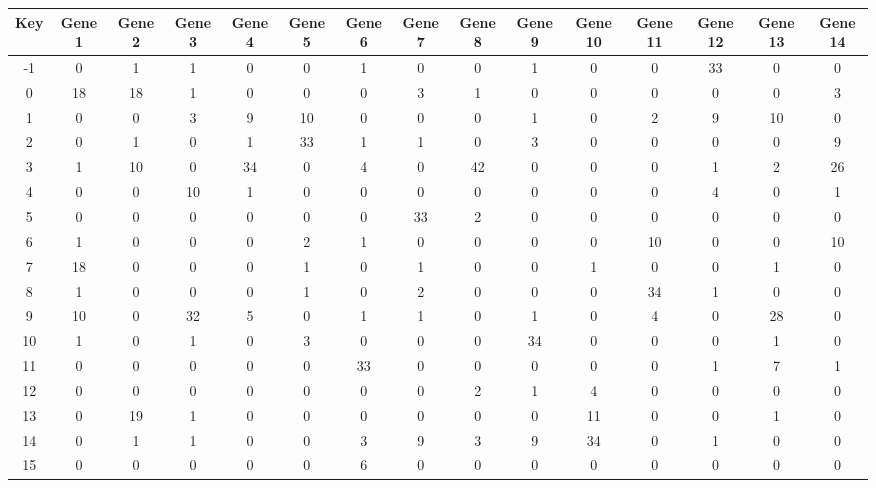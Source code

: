 \begin{tabular}{|c|c|c|c|c|c|c|c|c|c|c|c|c|c|c|}
\hline
Key & Gene 1 & Gene 2 & Gene 3 & Gene 4 & Gene 5 & Gene 6 & Gene 7 & Gene 8 & Gene 9 & Gene 10 & Gene 11 & Gene 12 & Gene 13 & Gene 14 \\
\hline
-1 & 0 & 1 & 1 & 0 & 0 & 1 & 0 & 0 & 1 & 0 & 0 & 33 & 0 & 0 \\
0 & 18 & 18 & 1 & 0 & 0 & 0 & 3 & 1 & 0 & 0 & 0 & 0 & 0 & 3 \\
1 & 0 & 0 & 3 & 9 & 10 & 0 & 0 & 0 & 1 & 0 & 2 & 9 & 10 & 0 \\
2 & 0 & 1 & 0 & 1 & 33 & 1 & 1 & 0 & 3 & 0 & 0 & 0 & 0 & 9 \\
3 & 1 & 10 & 0 & 34 & 0 & 4 & 0 & 42 & 0 & 0 & 0 & 1 & 2 & 26 \\
4 & 0 & 0 & 10 & 1 & 0 & 0 & 0 & 0 & 0 & 0 & 0 & 4 & 0 & 1 \\
5 & 0 & 0 & 0 & 0 & 0 & 0 & 33 & 2 & 0 & 0 & 0 & 0 & 0 & 0 \\
6 & 1 & 0 & 0 & 0 & 2 & 1 & 0 & 0 & 0 & 0 & 10 & 0 & 0 & 10 \\
7 & 18 & 0 & 0 & 0 & 1 & 0 & 1 & 0 & 0 & 1 & 0 & 0 & 1 & 0 \\
8 & 1 & 0 & 0 & 0 & 1 & 0 & 2 & 0 & 0 & 0 & 34 & 1 & 0 & 0 \\
9 & 10 & 0 & 32 & 5 & 0 & 1 & 1 & 0 & 1 & 0 & 4 & 0 & 28 & 0 \\
10 & 1 & 0 & 1 & 0 & 3 & 0 & 0 & 0 & 34 & 0 & 0 & 0 & 1 & 0 \\
11 & 0 & 0 & 0 & 0 & 0 & 33 & 0 & 0 & 0 & 0 & 0 & 1 & 7 & 1 \\
12 & 0 & 0 & 0 & 0 & 0 & 0 & 0 & 2 & 1 & 4 & 0 & 0 & 0 & 0 \\
13 & 0 & 19 & 1 & 0 & 0 & 0 & 0 & 0 & 0 & 11 & 0 & 0 & 1 & 0 \\
14 & 0 & 1 & 1 & 0 & 0 & 3 & 9 & 3 & 9 & 34 & 0 & 1 & 0 & 0 \\
15 & 0 & 0 & 0 & 0 & 0 & 6 & 0 & 0 & 0 & 0 & 0 & 0 & 0 & 0 \\
\hline
\end{tabular}